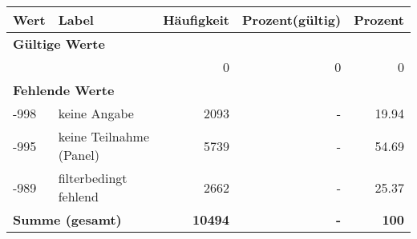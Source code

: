      \begin{longtable}{lXrrr}
     \toprule
     \textbf{Wert} & \textbf{Label} & \textbf{Häufigkeit} & \textbf{Prozent(gültig)} & \textbf{Prozent} \\
     \endhead
     \midrule
     \multicolumn{5}{l}{\textbf{Gültige Werte}}\\
      & & 0 & 0 & 0 \\
     \midrule
     \multicolumn{5}{l}{\textbf{Fehlende Werte}}\\
       -998 &
       keine Angabe &
         \num{2093} &
        - &
         \num[round-mode=places,round-precision=2]{19,94} \\
       -995 &
       keine Teilnahme (Panel) &
         \num{5739} &
        - &
         \num[round-mode=places,round-precision=2]{54,69} \\
       -989 &
       filterbedingt fehlend &
         \num{2662} &
        - &
         \num[round-mode=places,round-precision=2]{25,37} \\
     \midrule
     \multicolumn{2}{l}{\textbf{Summe (gesamt)}} &
          \textbf{\num{10494}} &
        \textbf{-} &
        \textbf{100} \\
     \bottomrule
     \end{longtable}
     
